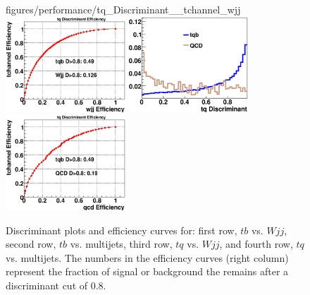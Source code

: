 \begin{figure}[!h!tbp]
{figures/performance/tq_Discriminant__tchannel_wjj}
\includegraphics[width=0.40\textwidth]
{figures/performance/tq_Efficiency__tchannel_wjj}
\includegraphics[width=0.40\textwidth]
{figures/performance/tq_Discriminant__tchannel_qcd}
\includegraphics[width=0.40\textwidth]
{figures/performance/tq_Efficiency__tchannel_qcd}
\caption[discwjets]{Discriminant plots and efficiency curves for:
first row, $tb$ vs. $Wjj$, second row, $tb$ vs. multijets, third row,
$tq$ vs. $Wjj$, and fourth row, $tq$ vs. multijets. The numbers in the
efficiency curves (right column) represent the fraction of signal or
background the remains after a discriminant cut of 0.8.}
\label{disc_wjets}
\end{figure}

